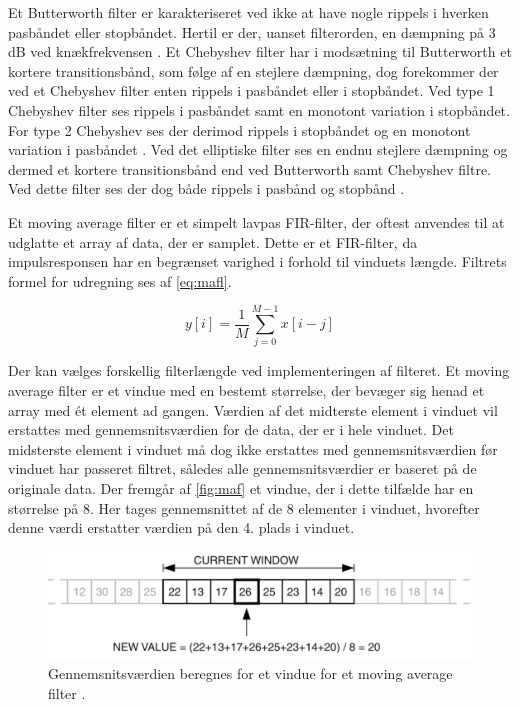 \noindent
Et Butterworth filter er karakteriseret ved ikke at have nogle rippels i hverken pasbåndet eller stopbåndet. Hertil er der, uanset filterorden, en dæmpning på 3 dB ved knækfrekvensen \citep{nilsson2015}.
Et Chebyshev filter har i modsætning til Butterworth et kortere transitionsbånd, som følge af en stejlere dæmpning, dog forekommer der ved et Chebyshev filter enten rippels i pasbåndet eller i stopbåndet. Ved type 1 Chebyshev filter ses rippels i pasbåndet samt en monotont variation i stopbåndet. For type 2 Chebyshev ses der derimod rippels i stopbåndet og en monotont variation i pasbåndet \citep{nilsson2015}. 
Ved det elliptiske filter ses en endnu stejlere dæmpning og dermed et kortere transitionsbånd end ved Butterworth samt Chebyshev filtre. Ved dette filter ses der dog både rippels i pasbånd og stopbånd \citep{nilsson2015}. 

\vspace{3mm}
Et moving average filter er et simpelt lavpas FIR-filter, der oftest anvendes til at udglatte et array af data, der er samplet. Dette er et FIR-filter, da impulsresponsen har en begrænset varighed i forhold til vinduets længde. Filtrets formel for udregning ses af \autoref{eq:mafl}.

\begin{equation}
	y[i]=\dfrac{1}{M}\sum^{M-1}_{j=0} x[i-j]
\label{eq:mafl}
\end{equation}

Der kan vælges forskellig filterlængde ved implementeringen af filteret. Et moving average filter er et vindue med en bestemt størrelse, der bevæger sig henad et array med ét element ad gangen. Værdien af det midterste element i vinduet vil erstattes med gennemsnitsværdien for de data, der er i hele vinduet. Det midsterste element i vinduet må dog ikke erstattes med gennemsnitsværdien før vinduet har passeret filtret, således alle gennemsnitsværdier er baseret på de originale data. Der fremgår af \autoref{fig:maf} et vindue, der i dette tilfælde har en størrelse på 8. Her tages gennemsnittet af de 8 elementer i vinduet, hvorefter denne værdi erstatter værdien på den 4. plads i vinduet.\citep{atmel2002}

\begin{figure} [H]
\centering
\includegraphics[width=1\textwidth]{figures/maf}
\caption{Gennemsnitsværdien beregnes for et vindue for et moving average filter \citep{atmel2002}.}
\label{fig:maf}
\end{figure} 

